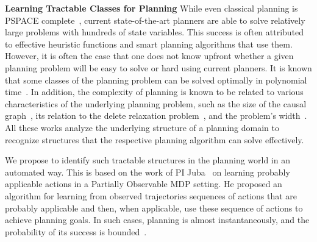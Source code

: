 \documentclass[12pt]{article}
\begin{document}





{\bf Learning Tractable Classes for Planning} %
While even classical planning is PSPACE complete~\cite{bylander1994computational}, 
current state-of-the-art planners are able to solve relatively large problems with hundreds of state variables. This success is often attributed to effective heuristic functions and smart planning algorithms that use them. However, it is often the case that one does not know upfront whether a given planning problem will be easy to solve or hard using current planners. It is known that some classes of the planning problem can be solved optimally in polynomial time~\cite{katz2008new}. In addition, the complexity of planning is known to be related to various characteristics of the underlying planning problem, such as the size of the causal graph~\cite{gimenez2012influence}, its relation to the delete relaxation problem~\cite{hoffmann2011analyzing}, and the problem's width~\cite{lipovetzky2012width}. All these works analyze the underlying structure of a planning domain to recognize structures that the respective planning algorithm can solve effectively. %

We propose to identify such tractable structures in the planning world in an automated way. This is based on the work of PI Juba~\cite{juba2016jmlr} on learning probably applicable 
actions in a Partially Observable MDP setting. He proposed 
an algorithm for learning from observed trajectories sequences of actions that are probably applicable and then, when applicable, use these sequence of actions to achieve planning goals. 
In such cases, planning is almost instantaneously, and the probability of its success is bounded~\cite{juba2016jmlr}. 
\end{document}
